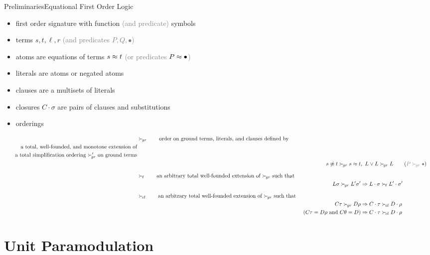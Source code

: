 \documentclass[%
handout,
]{beamer}
\begin{document}
\begin{frame}[allowframebreaks]{Preliminaries}{Equational First Order Logic}

    \begin{itemize}
        \item first order signature with function \textcolor{gray}{(and predicate)} symbols
        \item terms $s,t,\ell,r$ \textcolor{gray}{(and predicates $P, Q, \bullet$)}
        \item atoms are equations of terms $s\approx t$ \textcolor{gray}{(or predicates $P\approx\bullet$)}
        \item literals are atoms or negated atoms
        \item clauses are a multisets of literals
        \item closures $C\cdot\sigma$ are pairs of clauses and substitutions
        \framebreak
        \item orderings
    \end{itemize}
    \vspace{-1.4em}
    \begin{align*}
        &\succG
        \tag*{order on ground terms, literals, and clauses defined by}
        \\
        \tag*{a total, well-founded, and monotone extension of}
        \\
        \tag*{a total simplification ordering $\succG'$ on ground terms}
        \\
        &&s\mNE t \succG s\mEQ t &,\ L\lor L \succG L
        \tag{\textcolor{gray}{$P\succG\bullet$}}
        \\[0.7em]
        &\succL
        \tag*{an arbitrary total well-founded extension of $\succG$ such that}
        \\
        && L\sigma\succG L'\sigma' &\Rightarrow L\cdot\sigma\succL L'\cdot\sigma'\tag*{}
        \\[0.7em]
        &\succC \tag*{an arbitrary total well-founded extension of $\succG$ such that }
        \\
        && C\tau\succG D\rho
        &\Rightarrow C\cdot\tau\succC D\cdot\rho 
        \\
        && (C\tau=D\rho\text{ and }C\theta = D)
        &\Rightarrow C\cdot\tau\succC D\cdot\rho   \tag*{}
    \end{align*}
\end{frame}


\section{Unit Paramodulation}
\end{document}
